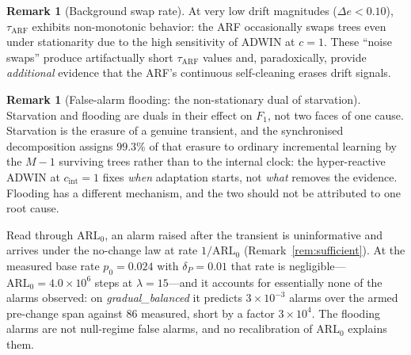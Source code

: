 \documentclass[10pt,conference]{IEEEtran}
\theoremstyle{definition}
\newtheorem{remark}[theorem]{Remark}
\newcommand{\DeltaPtext}{0.01}               %
\newcommand{\LambdaFA}{15}                   %
\newcommand{\LearnShare}{99.3}               %
\newcommand{\PzeroMeas}{0.024}               %
\newcommand{\ArlFifteen}{4.0\times10^{6}}    %
\newcommand{\FloodArlGap}{3\times10^{4}}     %
\begin{document}
\begin{remark}[Background swap rate]\label{rem:bgswap}
  At very low drift magnitudes ($\Delta e < 0.10$), $\tau_{\mathrm{ARF}}$ exhibits non-monotonic behavior: the ARF occasionally swaps trees even under stationarity due to the high sensitivity of ADWIN at $c = 1$.
  These ``noise swaps'' produce artifactually short $\tau_{\mathrm{ARF}}$ values and, paradoxically, provide \emph{additional} evidence that the ARF's continuous self-cleaning erases drift signals.
\end{remark}

\begin{remark}[False-alarm flooding: the non-stationary dual of starvation]\label{rem:flooding}
  Starvation and flooding are duals in their effect on $F_1$, not two faces of one cause. Starvation is the erasure of a genuine transient, and the synchronised decomposition assigns $\LearnShare\%$ of that erasure to ordinary incremental learning by the $M{-}1$ surviving trees rather than to the internal clock: the hyper-reactive ADWIN at $c_{\mathrm{int}}{=}1$ fixes \emph{when} adaptation starts, not \emph{what} removes the evidence. Flooding has a different mechanism, and the two should not be attributed to one root cause.

  Read through $\mathrm{ARL}_0$, an alarm raised after the transient is uninformative and arrives under the no-change law at rate $1/\mathrm{ARL}_0$ (Remark~\ref{rem:sufficient}). At the measured base rate $p_0 = \PzeroMeas$ with $\delta_P = \DeltaPtext$ that rate is negligible---$\mathrm{ARL}_0 = \ArlFifteen$ steps at $\lambda = \LambdaFA$---and it accounts for essentially none of the alarms observed: on \emph{gradual\_balanced} it predicts $3\times10^{-3}$ alarms over the armed pre-change span against $86$ measured, short by a factor $\FloodArlGap$. The flooding alarms are not null-regime false alarms, and no recalibration of $\mathrm{ARL}_0$ explains them.


\end{remark}
\end{document}
